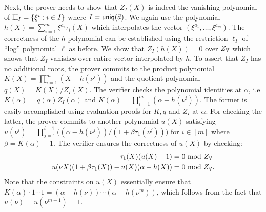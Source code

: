 Next, the prover needs to show that $Z_I(X)$ is indeed the vanishing polynomial of $\mathbb{H}_I=\{\xi^i: i\in I\}$ where $I=\mathsf{uniq}(\vec{{a}})$.
We again use the polynomial $h(X)=\sum_{i=1}^m \xi^{a_i}\tau_i(X)$ which interpolates the vector $(\xi^{a_1},\ldots,\xi^{a_m})$.
The correctness of the $h$ polynomial can be established using the restriction $\ell_I$ of ``log'' polynomial $\ell$ as before.
We show that $Z_I(h(X)) = 0$ over $Z_{\mathbb{V}}$ which shows that $Z_I$ vanishes over entire vector interpolated
by $h$. To assert that $Z_I$ has no additional roots, the prover commits to the product polynomial
$K(X)=\prod_{i=1}^m (X - h(\nu^i))$ and the quotient polynomial $q(X)=K(X)/Z_I(X)$. The verifier checks the polynomial identities
at $\alpha$, i.e $K(\alpha)=q(\alpha)Z_I(\alpha)$ and $K(\alpha)=\prod_{i=1}^m(\alpha - h(\nu^i))$. The former is easily accomplished
using evaluation proofs for $K,q$ and $Z_I$ at $\alpha$. For checking the latter, the prover commits to another polynomial
$u(X)$ satisfying $u(\nu^i)=\prod_{j=1}^{i-1}\big((\alpha - h(\nu^j))/(1 + \beta\tau_1(\nu^j))\big)$ for $i\in [m]$
where $\beta=K(\alpha) - 1$.
The verifier ensures the correctness of $u(X)$ by checking:
\begin{align*}
\tau_1(X)(u(X) - 1) &= 0 \text{ mod } Z_{\mathbb{V}} \\
u(\nu X)(1+\beta \tau_1(X))-u(X)(\alpha - h(X)) &= 0 \text{ mod } Z_{\mathbb{V}}.
\end{align*}
Note that the constraints on $u(X)$ essentially
ensure that $K(\alpha)\cdot 1\cdots 1 = (\alpha - h(\nu))\cdots (\alpha - h(\nu^m))$, which follows from the fact that
$u(\nu)=u(\nu^{m+1})=1$.

